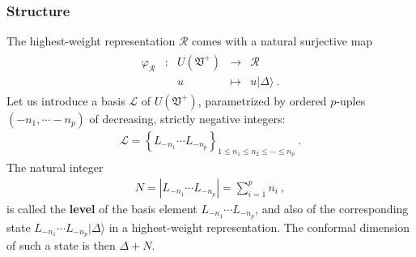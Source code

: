 \documentclass[12pt, a4paper, notitlepage, twoside]{report}
\numberwithin{equation}{section}
\theoremstyle{break}
\begin{document}
\subsubsection{Structure}

The highest-weight representation $\mathcal{R}$
comes with a natural surjective map
\begin{align}
\begin{array}{cclcl}
 \varphi_\mathcal{R} & : & U(\mathfrak{V}^+) & \rightarrow & \mathcal{R} 
\\
 &  & u & \mapsto & u|\Delta\rangle \ .
\end{array}
\label{pur}
\end{align}
Let us introduce a basis $\mathcal{L}$ of $U(\mathfrak{V}^+)$, parametrized by ordered $p$-uples $(-n_1,\cdots -n_p)$ of decreasing, strictly negative integers:
\begin{align}
\mathcal{L} =   \left\{ L_{-n_1} \cdots L_{-n_p}  \right\}_{1\leq n_1\leq n_2\leq \cdots \leq n_p} \ .
\label{lels}
\end{align}
The natural integer
\begin{align}
 N=\left|L_{-n_1} \cdots L_{-n_p}\right|=\sum_{i=1}^p n_i \ ,
\label{nsn}
\end{align}
is called the \textbf{level} of the basis element $L_{-n_1} \cdots L_{-n_p}$, and also of the corresponding state $L_{-n_1} \cdots L_{-n_p}|\Delta\rangle$ in a highest-weight representation.
The conformal dimension of such a state is then $\Delta+N$. 
\end{document}
